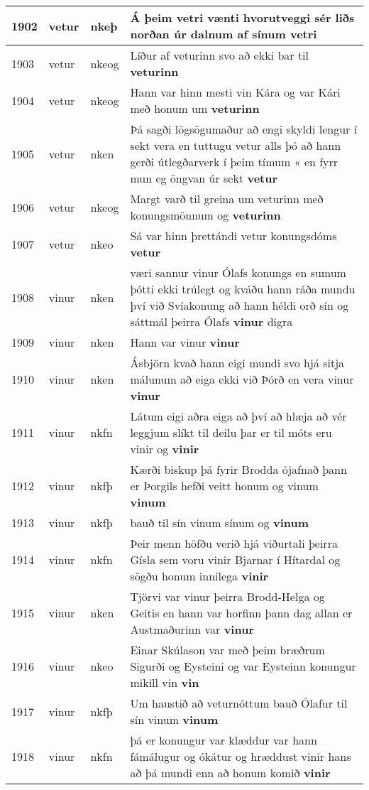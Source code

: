 \documentclass{article}
\begin{document}
\begin{longtable}{p{1cm}|p{1cm}|p{1cm}|p{13cm}}
\hline
1902&vetur&nkeþ&Á þeim vetri vænti hvorutveggi sér liðs norðan úr dalnum af sínum \textbf{vetri} \\
\hline
1903&vetur&nkeog&Líður af veturinn svo að ekki bar til \textbf{veturinn} \\
\hline
1904&vetur&nkeog&Hann var hinn mesti vin Kára og var Kári með honum um \textbf{veturinn} \\
\hline
1905&vetur&nken&Þá sagði lögsögumaður að engi skyldi lengur í sekt vera en tuttugu vetur alls þó að hann gerði útlegðarverk í þeim tímum « en fyrr mun eg öngvan úr sekt \textbf{vetur} \\
\hline
1906&vetur&nkeog&Margt varð til greina um veturinn með konungsmönnum og \textbf{veturinn} \\
\hline
1907&vetur&nkeo&Sá var hinn þrettándi vetur konungsdóms \textbf{vetur} \\
\hline
1908&vinur&nken&væri sannur vinur Ólafs konungs en sumum þótti ekki trúlegt og kváðu hann ráða mundu því við Svíakonung að hann héldi orð sín og sáttmál þeirra Ólafs \textbf{vinur} digra\\
\hline
1909&vinur&nken&Hann var vinur \textbf{vinur} \\
\hline
1910&vinur&nken&Ásbjörn kvað hann eigi mundi svo hjá sitja málunum að eiga ekki við Þórð en vera vinur \textbf{vinur} \\
\hline
1911&vinur&nkfn&Látum eigi aðra eiga að því að hlæja að vér leggjum slíkt til deilu þar er til móts eru vinir og \textbf{vinir} \\
\hline
1912&vinur&nkfþ&Kærði biskup þá fyrir Brodda ójafnað þann er Þorgils hefði veitt honum og vinum \textbf{vinum} \\
\hline
1913&vinur&nkfþ&bauð til sín vinum sínum og \textbf{vinum} \\
\hline
1914&vinur&nkfn&Þeir menn höfðu verið hjá viðurtali þeirra Gísla sem voru vinir Bjarnar í Hítardal og sögðu honum innilega \textbf{vinir} \\
\hline
1915&vinur&nken&Tjörvi var vinur þeirra Brodd-Helga og Geitis en hann var horfinn þann dag allan er Austmaðurinn var \textbf{vinur} \\
\hline
1916&vinur&nkeo&Einar Skúlason var með þeim bræðrum Sigurði og Eysteini og var Eysteinn konungur mikill vin \textbf{vin} \\
\hline
1917&vinur&nkfþ&Um haustið að veturnóttum bauð Ólafur til sín vinum \textbf{vinum} \\
\hline
1918&vinur&nkfn&þá er konungur var klæddur var hann fámálugur og ókátur og hræddust vinir hans að þá mundi enn að honum komið \textbf{vinir} \\

\end{longtable}
\end{document}
